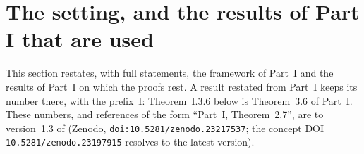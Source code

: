 \section{The setting, and the results of Part I that are used}\label{sec:setting}

This section restates, with full statements, the framework of Part~I \cite{Joh26} and the results of Part~I on which the proofs rest. A
result restated from Part~I keeps its number
there, with the prefix~I: Theorem~I.3.6 below is Theorem~3.6 of Part~I. These numbers, and references of the form ``Part~I, Theorem~2.7'', are to
version~1.3 of \cite{Joh26} (Zenodo, \texttt{doi:10.5281/zenodo.23217537}; the concept DOI \texttt{10.5281/zenodo.23197915} resolves to the latest
version).

